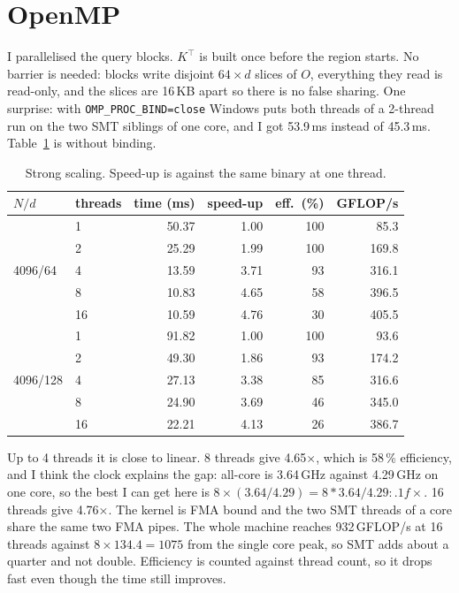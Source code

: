 \documentclass[10pt,a4paper]{article}
\newcommand{\code}[1]{\texttt{\small #1}}
\begin{document}
\section{OpenMP}

I parallelised the query blocks. $K^{\top}$ is built once before the region
starts. No barrier is needed: blocks write disjoint $64\times d$ slices of $O$,
everything they read is read-only, and the slices are 16\,KB apart so there is no
false sharing. One surprise: with \code{OMP\_PROC\_BIND=close} Windows puts both
threads of a 2-thread run on the two SMT siblings of one core, and I got
53.9\,ms instead of 45.3\,ms. Table~\ref{tab:omp} is without binding.

\begin{table}[htbp]
\centering\footnotesize
\caption{Strong scaling. Speed-up is against the same binary at one thread.}
\label{tab:omp}
\begin{tabular}{@{}llrrrr@{}}
\toprule
$N/d$ & threads & time (ms) & speed-up & eff.\ (\%) & GFLOP/s \\
\midrule
\multirow{5}{*}{4096/64} &  1 &    50.37 &  1.00 &  100 &   85.3 \\
 &  2 &    25.29 &  1.99 &  100 &  169.8 \\
 &  4 &    13.59 &  3.71 &   93 &  316.1 \\
 &  8 &    10.83 &  4.65 &   58 &  396.5 \\
 & 16 &    10.59 &  4.76 &   30 &  405.5 \\
\midrule
\multirow{5}{*}{4096/128} &  1 &    91.82 &  1.00 &  100 &   93.6 \\
 &  2 &    49.30 &  1.86 &   93 &  174.2 \\
 &  4 &    27.13 &  3.38 &   85 &  316.6 \\
 &  8 &    24.90 &  3.69 &   46 &  345.0 \\
 & 16 &    22.21 &  4.13 &   26 &  386.7 \\
\bottomrule
\end{tabular}
\end{table}

Up to 4 threads it is close to linear. 8 threads give
4.65$\times$, which is
58\,\% efficiency, and I think the
clock explains the gap: all-core is 3.64\,GHz against 4.29\,GHz on one core, so the
best I can get here is $8\times(3.64/4.29)={8*3.64/4.29:.1f}\times$. 16 threads give
4.76$\times$. The kernel is FMA bound and
the two SMT threads of a core share the same two FMA pipes. The whole machine
reaches 932\,GFLOP/s at 16 threads against
$8\times134.4=1075$ from the single core peak, so SMT adds about a
quarter and not double. Efficiency is counted against thread count, so it drops
fast even though the time still improves.
\end{document}
